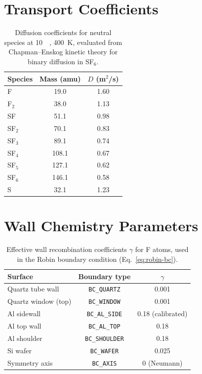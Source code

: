 \documentclass[11pt,a4paper]{report}
\begin{document}
\section{Transport Coefficients}
\label{app:transport}

\begin{table}[H]
\centering
\caption{Diffusion coefficients for neutral species at \SI{10}{\milli\torr}, \SI{400}{\kelvin}, evaluated from Chapman--Enskog kinetic theory for binary diffusion in SF$_6$.}
\label{tab:app-diffusion}
\begin{tabular}{@{}lcc@{}}
\toprule
\textbf{Species} & \textbf{Mass (amu)} & $D$ \textbf{(m$^2$/s)} \\
\midrule
F       & 19.0   & 1.60 \\
F$_2$   & 38.0   & 1.13 \\
SF      & 51.1   & 0.98 \\
SF$_2$  & 70.1   & 0.83 \\
SF$_3$  & 89.1   & 0.74 \\
SF$_4$  & 108.1  & 0.67 \\
SF$_5$  & 127.1  & 0.62 \\
SF$_6$  & 146.1  & 0.58 \\
S       & 32.1   & 1.23 \\
\bottomrule
\end{tabular}
\end{table}


\section{Wall Chemistry Parameters}
\label{app:wall}

\begin{table}[H]
\centering
\caption{Effective wall recombination coefficients $\gamma$ for F atoms, used in the Robin boundary condition (Eq.~\ref{eq:robin-bc}).}
\label{tab:app-gamma}
\begin{tabular}{@{}lcc@{}}
\toprule
\textbf{Surface} & \textbf{Boundary type} & $\gamma$ \\
\midrule
Quartz tube wall       & \texttt{BC\_QUARTZ}    & 0.001 \\
Quartz window (top)    & \texttt{BC\_WINDOW}    & 0.001 \\
Al sidewall            & \texttt{BC\_AL\_SIDE}  & 0.18 (calibrated) \\
Al top wall            & \texttt{BC\_AL\_TOP}   & 0.18 \\
Al shoulder            & \texttt{BC\_SHOULDER}  & 0.18 \\
Si wafer               & \texttt{BC\_WAFER}     & 0.025 \\
Symmetry axis          & \texttt{BC\_AXIS}      & 0 (Neumann) \\
\bottomrule
\end{tabular}
\end{table}
\end{document}
